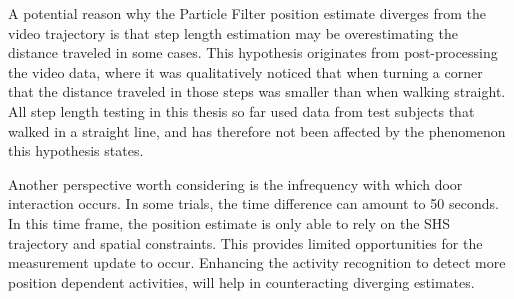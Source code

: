 A potential reason why the Particle Filter position estimate diverges from the video trajectory is that step length estimation may be overestimating the distance traveled in some cases. This hypothesis originates from post-processing the video data, where it was qualitatively noticed that when turning a corner that the distance traveled in those steps was smaller than when walking straight. All step length testing in this thesis so far used data from test subjects that walked in a straight line, and has therefore not been affected by the phenomenon this hypothesis states.\par 

Another perspective worth considering is the infrequency with which door interaction occurs. In some trials, the time difference can amount to 50 seconds. In this time frame, the position estimate is only able to rely on the SHS trajectory and spatial constraints. This provides limited opportunities for the measurement update to occur. Enhancing the activity recognition to detect more position dependent activities, will help in counteracting diverging estimates. 

\newpage
 
